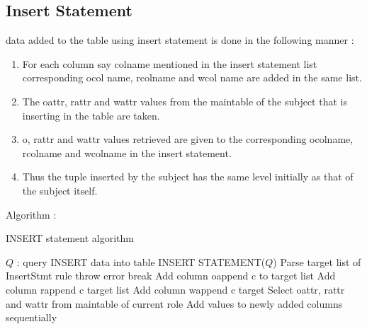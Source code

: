 \documentclass[11pt,a4paper]{report}
\begin{document}
\subsection{Insert Statement}
data added to the table using insert statement is done in the     
following manner :     
\begin{enumerate}
    \item For each  column say col\textunderscore name  mentioned in the insert statement list corresponding o\textunderscore col \textunderscore name, r\textunderscore col\textunderscore name and w\textunderscore col \textunderscore name are added in the same list. 
    \item The o\textunderscore attr, r\textunderscore attr and w\textunderscore attr values from the main\textunderscore table of the subject that is inserting in the table are taken.
    \item o\textunderscore, r\textunderscore attr and w\textunderscore attr values retrieved are given to the corresponding o\textunderscore col\textunderscore name, r\textunderscore col\textunderscore name and w\textunderscore col\textunderscore name in the insert statement.
    \item Thus the tuple inserted by the subject has the same level initially as that of the subject itself. 
\end{enumerate}

Algorithm :
\begin{algorithm}[H]
\caption{INSERT statement algorithm}
\renewcommand{\algorithmicrequire}{\textbf{Inputs:}}
\begin{algorithmic}[1]
\REQUIRE $Q$ : query
\ENSURE INSERT data into table
\STATE INSERT STATEMENT($Q$)  
  \STATE Parse target list of InsertStmt rule
   \STATE throw error
   \STATE break
   \ELSE 
   \STATE Add column o\textunderscore append c to target list
   \STATE Add column r\textunderscore append c target list
   \STATE Add column w\textunderscore append c target
   \STATE Select o\textunderscore attr, r\textunderscore attr and w\textunderscore attr from main\textunderscore table of current role
   \STATE Add values to newly added columns sequentially
   \ENDIF
   \ENDFOR
\end{algorithmic}
\end{algorithm}
\end{document}
